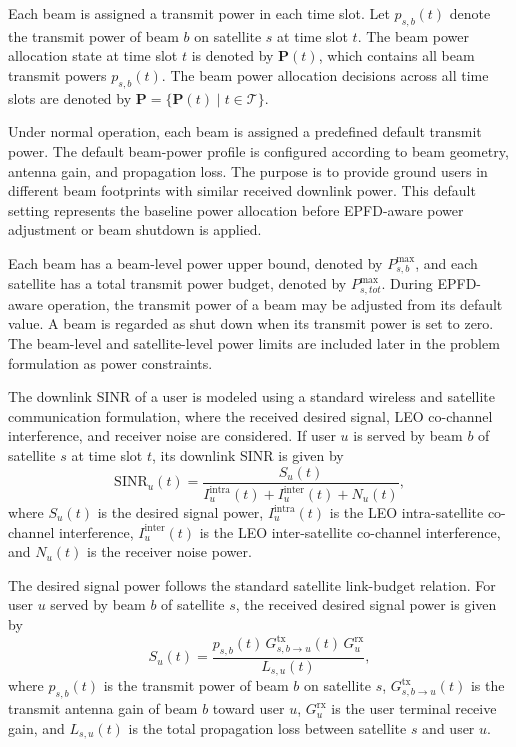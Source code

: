 Each beam is assigned a transmit power in each time slot. Let $p_{s,b}(t)$ denote the transmit power of beam $b$ on satellite $s$ at time slot $t$. The beam power allocation state at time slot $t$ is denoted by $\mathbf{P}(t)$, which contains all beam transmit powers $p_{s,b}(t)$. The beam power allocation decisions across all time slots are denoted by $\mathbf{P}=\{\mathbf{P}(t)\mid t\in\mathcal{T}\}$.

Under normal operation, each beam is assigned a predefined default transmit power. The default beam-power profile is configured according to beam geometry, antenna gain, and propagation loss. The purpose is to provide ground users in different beam footprints with similar received downlink power. This default setting represents the baseline power allocation before EPFD-aware power adjustment or beam shutdown is applied.

Each beam has a beam-level power upper bound, denoted by $P_{s,b}^{\max}$, and each satellite has a total transmit power budget, denoted by $P_{s,tot}^{\max}$. During EPFD-aware operation, the transmit power of a beam may be adjusted from its default value. A beam is regarded as shut down when its transmit power is set to zero. The beam-level and satellite-level power limits are included later in the problem formulation as power constraints.

The downlink SINR of a user is modeled using a standard wireless and satellite communication formulation, where the received desired signal, LEO co-channel interference, and receiver noise are considered. If user $u$ is served by beam $b$ of satellite $s$ at time slot $t$, its downlink SINR is given by
\begin{equation}
\mathrm{SINR}_u(t)=\frac{S_u(t)}{I_u^{\mathrm{intra}}(t)+I_u^{\mathrm{inter}}(t)+N_u(t)},
\label{eq:ch3_SINR}
\end{equation}
where $S_u(t)$ is the desired signal power, $I_u^{\mathrm{intra}}(t)$ is the LEO intra-satellite co-channel interference, $I_u^{\mathrm{inter}}(t)$ is the LEO inter-satellite co-channel interference, and $N_u(t)$ is the receiver noise power.

The desired signal power follows the standard satellite link-budget relation. For user $u$ served by beam $b$ of satellite $s$, the received desired signal power is given by
\begin{equation*}
S_u(t)=\frac{p_{s,b}(t)\,G^{\mathrm{tx}}_{s,b\to u}(t)\,G^{\mathrm{rx}}_u}{L_{s,u}(t)},
\end{equation*}
where $p_{s,b}(t)$ is the transmit power of beam $b$ on satellite $s$, $G^{\mathrm{tx}}_{s,b\to u}(t)$ is the transmit antenna gain of beam $b$ toward user $u$, $G^{\mathrm{rx}}_u$ is the user terminal receive gain, and $L_{s,u}(t)$ is the total propagation loss between satellite $s$ and user $u$.

